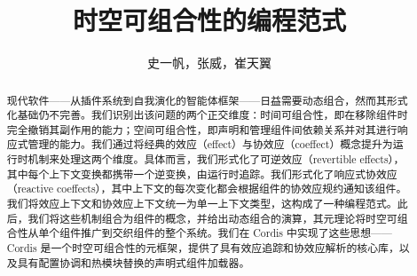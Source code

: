 \documentclass[lang=cn,12pt]{elegantpaper}
\title{时空可组合性的编程范式}
\author{史一帆，张威，崔天翼}
\institute{北京大学，DeepSeek-AI}
\date{}
\begin{document}
\maketitle

\begin{abstract}
现代软件——从插件系统到自我演化的智能体框架——日益需要动态组合，然而其形式化基础仍不完善。我们识别出该问题的两个正交维度：时间可组合性，即在移除组件时完全撤销其副作用的能力；空间可组合性，即声明和管理组件间依赖关系并对其进行响应式管理的能力。我们通过将经典的效应（effect）与协效应（coeffect）概念提升为运行时机制来处理这两个维度。具体而言，我们形式化了可逆效应（revertible effects），其中每个上下文变换都携带一个逆变换，由运行时追踪。我们形式化了响应式协效应（reactive coeffects），其中上下文的每次变化都会根据组件的协效应规约通知该组件。我们将效应上下文和协效应上下文统一为单一上下文类型，这构成了一种编程范式。此后，我们将这些机制组合为组件的概念，并给出动态组合的演算，其元理论将时空可组合性从单个组件推广到交织组件的整个系统。我们在 Cordis 中实现了这些思想——Cordis 是一个时空可组合性的元框架，提供了具有效应追踪和协效应解析的核心库，以及具有配置协调和热模块替换的声明式组件加载器。
\end{abstract}










\printbibliography[heading=bibintoc,title={参考文献}]
\end{document}

